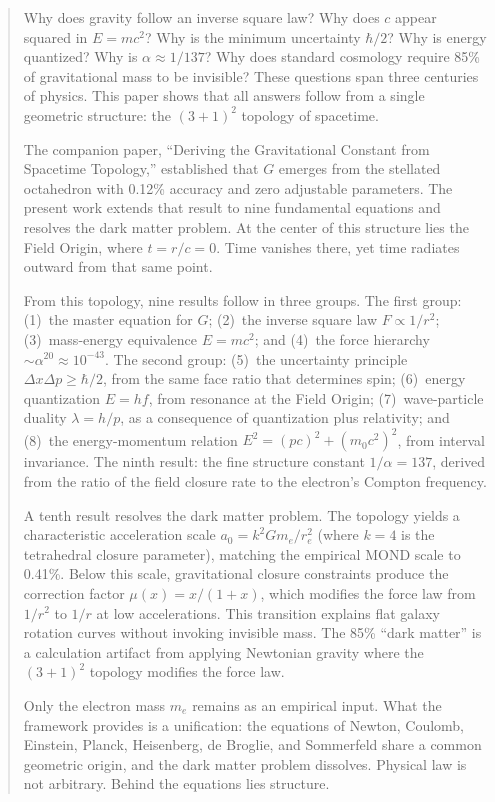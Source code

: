 \documentclass[aps,prd,preprint,superscriptaddress,showpacs,preprintnumbers,amsmath,amssymb,nofootinbib]{revtex4-2}
\begin{document}
\begin{abstract}
Why does gravity follow an inverse square law? Why does $c$ appear squared in $E = mc^2$? Why is the minimum uncertainty $\hbar/2$? Why is energy quantized? Why is $\alpha \approx 1/137$? Why does standard cosmology require 85\% of gravitational mass to be invisible? These questions span three centuries of physics. This paper shows that all answers follow from a single geometric structure: the $(3+1)^2$ topology of spacetime.

The companion paper, ``Deriving the Gravitational Constant from Spacetime Topology,'' established that $G$ emerges from the stellated octahedron with 0.12\% accuracy and zero adjustable parameters. The present work extends that result to nine fundamental equations and resolves the dark matter problem. At the center of this structure lies the Field Origin, where $t = r/c = 0$. Time vanishes there, yet time radiates outward from that same point.

From this topology, nine results follow in three groups. The first group: (1)~the master equation for $G$; (2)~the inverse square law $F \propto 1/r^2$; (3)~mass-energy equivalence $E = mc^2$; and (4)~the force hierarchy $\sim\alpha^{20} \approx 10^{-43}$. The second group: (5)~the uncertainty principle $\Delta x \Delta p \geq \hbar/2$, from the same face ratio that determines spin; (6)~energy quantization $E = hf$, from resonance at the Field Origin; (7)~wave-particle duality $\lambda = h/p$, as a consequence of quantization plus relativity; and (8)~the energy-momentum relation $E^2 = (pc)^2 + (m_0 c^2)^2$, from interval invariance. The ninth result: the fine structure constant $1/\alpha = 137$, derived from the ratio of the field closure rate to the electron's Compton frequency.

A tenth result resolves the dark matter problem. The topology yields a characteristic acceleration scale $a_0 = k^2 Gm_e/r_e^2$ (where $k = 4$ is the tetrahedral closure parameter), matching the empirical MOND scale to 0.41\%. Below this scale, gravitational closure constraints produce the correction factor $\mu(x) = x/(1+x)$, which modifies the force law from $1/r^2$ to $1/r$ at low accelerations. This transition explains flat galaxy rotation curves without invoking invisible mass. The 85\% ``dark matter'' is a calculation artifact from applying Newtonian gravity where the $(3+1)^2$ topology modifies the force law.

Only the electron mass $m_e$ remains as an empirical input. What the framework provides is a unification: the equations of Newton, Coulomb, Einstein, Planck, Heisenberg, de Broglie, and Sommerfeld share a common geometric origin, and the dark matter problem dissolves. Physical law is not arbitrary. Behind the equations lies structure.
\end{abstract}
\end{document}
